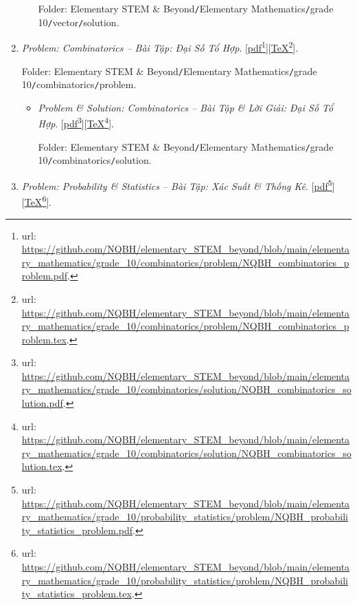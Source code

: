 \documentclass[12pt,oneside]{book}
\begin{document}
\begin{enumerate}
\begin{itemize}
		Folder: {\sf Elementary STEM \& Beyond{\tt/}Elementary Mathematics{\tt/}grade 10{\tt/}vector{\tt/}solution}.
	\end{itemize}
	\item {\it Problem: Combinatorics -- Bài Tập: Đại Số Tổ Hợp}. [\href{https://github.com/NQBH/elementary_STEM_beyond/blob/main/elementary_mathematics/grade_10/combinatorics/problem/NQBH_combinatorics_problem.pdf}{pdf}\footnote{{\sc url}: \url{https://github.com/NQBH/elementary_STEM_beyond/blob/main/elementary_mathematics/grade_10/combinatorics/problem/NQBH_combinatorics_problem.pdf}.}][\href{https://github.com/NQBH/elementary_STEM_beyond/blob/main/elementary_mathematics/grade_10/combinatorics/problem/NQBH_combinatorics_problem.tex}{\TeX}\footnote{{\sc url}: \url{https://github.com/NQBH/elementary_STEM_beyond/blob/main/elementary_mathematics/grade_10/combinatorics/problem/NQBH_combinatorics_problem.tex}.}].
	
	Folder: {\sf Elementary STEM \& Beyond{\tt/}Elementary Mathematics{\tt/}grade 10{\tt/}combinatorics{\tt/}problem}.
	\begin{itemize}
		\item {\it Problem \& Solution: Combinatorics -- Bài Tập \& Lời Giải: Đại Số Tổ Hợp}. [\href{https://github.com/NQBH/elementary_STEM_beyond/blob/main/elementary_mathematics/grade_10/combinatorics/solution/NQBH_combinatorics_solution.pdf}{pdf}\footnote{{\sc url}: \url{https://github.com/NQBH/elementary_STEM_beyond/blob/main/elementary_mathematics/grade_10/combinatorics/solution/NQBH_combinatorics_solution.pdf}.}][\href{https://github.com/NQBH/elementary_STEM_beyond/blob/main/elementary_mathematics/grade_10/combinatorics/solution/NQBH_combinatorics_solution.tex}{\TeX}\footnote{{\sc url}: \url{https://github.com/NQBH/elementary_STEM_beyond/blob/main/elementary_mathematics/grade_10/combinatorics/solution/NQBH_combinatorics_solution.tex}.}].
		
		Folder: {\sf Elementary STEM \& Beyond{\tt/}Elementary Mathematics{\tt/}grade 10{\tt/}combinatorics{\tt/}solution}.
	\end{itemize}
	\item {\it Problem: Probability \& Statistics -- Bài Tập: Xác Suất \& Thống Kê}. [\href{https://github.com/NQBH/elementary_STEM_beyond/blob/main/elementary_mathematics/grade_10/probability_statistics/problem/NQBH_probability_statistics_problem.pdf}{pdf}\footnote{{\sc url}: \url{https://github.com/NQBH/elementary_STEM_beyond/blob/main/elementary_mathematics/grade_10/probability_statistics/problem/NQBH_probability_statistics_problem.pdf}.}][\href{https://github.com/NQBH/elementary_STEM_beyond/blob/main/elementary_mathematics/grade_10/probability_statistics/problem/NQBH_probability_statistics_problem.tex}{\TeX}\footnote{{\sc url}: \url{https://github.com/NQBH/elementary_STEM_beyond/blob/main/elementary_mathematics/grade_10/probability_statistics/problem/NQBH_probability_statistics_problem.tex}.}].
	

\end{enumerate}
\end{document}
